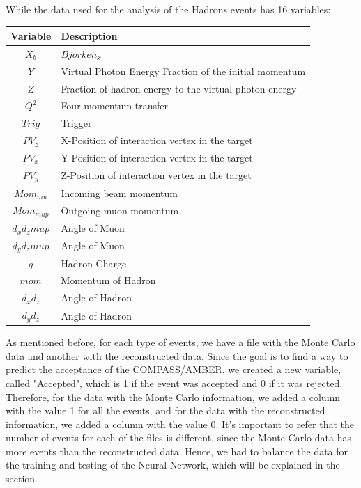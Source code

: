 \documentclass{article}
\begin{document}
While the data used for the analysis of the Hadrons events has 16 variables:

\begin{table}[H]
    \centering
    \begin{tabular}{c|l}
    \textbf{Variable} & \textbf{Description} \\ \hline
    $X_b$ & $Bjorken_x$ \\
    $Y$ & Virtual Photon Energy Fraction of the initial momentum\\
    $Z$ & Fraction of hadron energy to the virtual photon energy \\
    $Q^2$ & Four-momentum transfer \\
    $Trig$ & Trigger \\
    $PV_z$ & X-Position of interaction vertex in the target\\
    $PV_x$ & Y-Position of interaction vertex in the target\\
    $PV_y$ & Z-Position of interaction vertex in the target\\
    $Mom_{mu}$ & Incoming beam momentum\\
    $Mom_{mup}$ & Outgoing muon momentum\\
    $d_xd_zmup$ & Angle of Muon \\
    $d_yd_zmup$ & Angle of Muon \\
    $q$ & Hadron Charge \\
    $mom$ & Momentum of Hadron \\
    $d_xd_z$ & Angle of Hadron \\
    $d_yd_z$ & Angle of Hadron \\
    \end{tabular}
\end{table}



As mentioned before, for each type of events, we have a file with the Monte Carlo data and another with the reconstructed data.
Since the goal is to find a way to predict the acceptance of the COMPASS/AMBER, we created a new variable, called "Accepted",
which is 1 if the event was accepted and 0 if it was rejected. Therefore, for the data with the Monte Carlo information, we added
a column with the value 1 for all the events, and for the data with the reconstructed information, we added a column with the value 0.
It's important to refer that the number of events for each of the files is different, since the Monte Carlo data has more events than the reconstructed data.
Hence, we had to balance the data for the training and testing of the Neural Network, which will be explained in the section.
\end{document}
